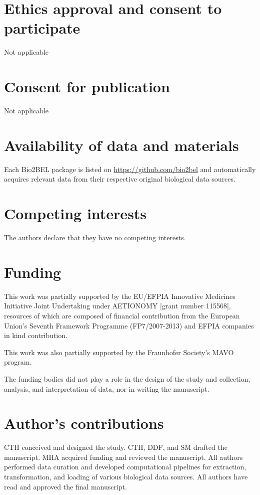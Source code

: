 \documentclass{bmcart}
\begin{document}
\begin{backmatter}
\section*{Ethics approval and consent to participate}
Not applicable

\section*{Consent for publication}
Not applicable

\section*{Availability of data and materials}
Each Bio2BEL package is listed on \url{https://github.com/bio2bel} and automatically acquires relevant data from their respective original biological data sources.

\section*{Competing interests}
The authors declare that they have no competing interests.

\section*{Funding}
This work was partially supported by the EU/EFPIA Innovative Medicines Initiative Joint Undertaking under AETIONOMY [grant number 115568], resources of which are composed of financial contribution from the European Union's Seventh Framework Programme (FP7/2007-2013) and EFPIA companies in kind contribution.

This work was also partially supported by the Fraunhofer Society's MAVO program.

The funding bodies did not play a role in the design of the study and collection, analysis, and interpretation of data, nor in writing the manuscript.

\section*{Author's contributions}
CTH conceived and designed the study.
CTH, DDF, and SM drafted the manuscript.
MHA acquired funding and reviewed the manuscript.
All authors performed data curation and developed computational pipelines for extraction, transformation, and loading of various biological data sources.
All authors have read and approved the final manuscript.


\end{backmatter}
\end{document}
